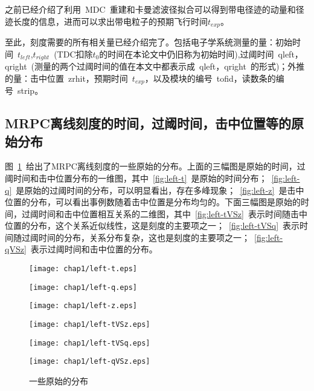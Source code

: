 之前已经介绍了利用~MDC~重建和卡曼滤波径拟合可以得到带电径迹的动量和径迹长度的信息，进而可以求出带电粒子的预期飞行时间$t_{exp}$。

至此，刻度需要的所有相关量已经介绍完了。包括电子学系统测量的量：初始时间~$t_{left}$,$t_{right}$~(TDC扣除$t_{0}$的时间在本论文中仍旧称为初始时间),过阈时间~qleft，qright~(测量的两个过阈时间的值在本文中都表示成~qleft，qright~的形式)；外推的量：击中位置~zrhit，预期时间~$t_{exp}$，以及模块的编号~tofid，读数条的编号~strip。
\subsection{MRPC离线刻度的时间，过阈时间，击中位置等的原始分布}
图~\ref{fig:some-Diagram}~给出了MRPC离线刻度的一些原始的分布。上面的三幅图是原始的时间，过阈时间和击中位置分布的一维图，其中~\ref{fig:left-t}~是原始的时间分布；~\ref{fig:left-q}~是原始的过阈时间的分布，可以明显看出，存在多峰现象；~\ref{fig:left-z}~是击中位置的分布，可以看出事例数随着击中位置是分布均匀的。下面三幅图是原始的时间，过阈时间和击中位置相互关系的二维图，其中~\ref{fig:left-tVSz}~表示时间随击中位置的分布，这个关系近似线性，这是刻度的主要项之一；~\ref{fig:left-tVSq}~表示时间随过阈时间的分布，关系分布复杂，这也是刻度的主要项之一；~\ref{fig:left-qVSz}~表示过阈时间和击中位置的分布。

\begin{figure}[htbp]
\begin{minipage}[t]{0.33\linewidth}
\texttt{[image: chap1/left-t.eps]}
\label{fig:left-t}
\end{minipage}%
\hfill
\begin{minipage}[t]{0.33\linewidth}
\texttt{[image: chap1/left-q.eps]}
\label{fig:left-q}
\end{minipage}
\hfill
\begin{minipage}[t]{0.33\linewidth}
\texttt{[image: chap1/left-z.eps]}
\label{fig:left-z}
\end{minipage}
\vfill
\begin{minipage}[t]{0.33\linewidth}
\texttt{[image: chap1/left-tVSz.eps]}
\label{fig:left-tVSz}
\end{minipage}%
\hfill
\begin{minipage}[t]{0.33\linewidth}
\texttt{[image: chap1/left-tVSq.eps]}
\label{fig:left-tVSq}
\end{minipage}
\hfill
\begin{minipage}[t]{0.33\linewidth}
\texttt{[image: chap1/left-qVSz.eps]}
\label{fig:left-qVSz}
\end{minipage}
\caption{一些原始的分布}
\label{fig:some-Diagram}
\end{figure}

